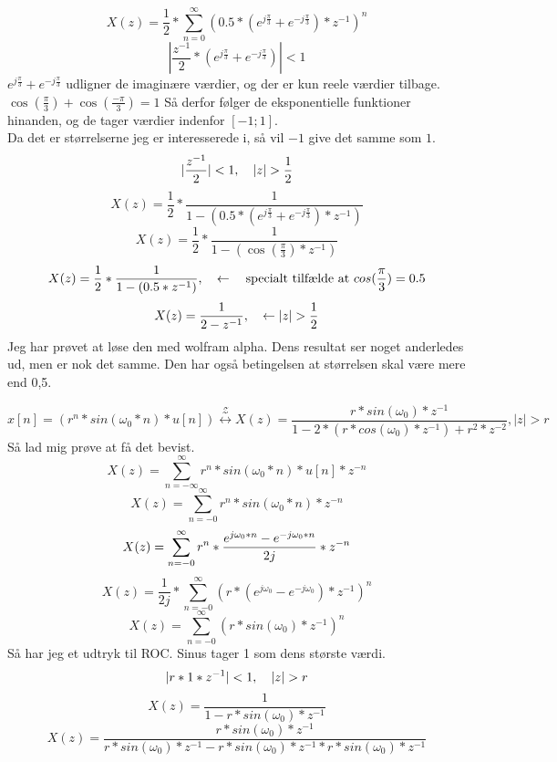 \begin{Opgaver}
\begin{kapitel}
\begin{Opgave}
\begin{UnderOpgave}[\text{$x[n] = (1/2)^n * cos(\pi * n/3)*u[n]$}, forkert]
                \[X(z) = \frac{1}{2} * \sum_{n=0}^{\infty}{(0.5 * (e^{j\frac{\pi}{3}} + e^{-j\frac{\pi}{3}}) * z^{-1})^n }\]
                \[|\frac{z^{-1}}{2} * (e^{j\frac{\pi}{3}} + e^{-j\frac{\pi}{3}})| < 1\]
                $e^{j\frac{\pi}{3}} + e^{-j\frac{\pi}{3}}$ udligner de imaginære værdier, og der er kun reele værdier tilbage. $\cos(\frac{\pi}{3}) + \cos(\frac{-\pi}{3}) = 1$
                Så derfor følger de eksponentielle funktioner hinanden, og de tager værdier indenfor $[-1; 1]$.\\
                Da det er størrelserne jeg er interesserede i, så vil $-1$ give det samme som $1$.\\
                \[|\frac{z^{-1}}{2}| < 1, \quad |z| > \frac{1}{2}\]
                \[X(z) = \frac{1}{2} * \frac{1}{1 - (0.5 * (e^{j\frac{\pi}{3}} + e^{-j\frac{\pi}{3}}) * z^{-1})}\]
                \[X(z) = \frac{1}{2} * \frac{1}{1 - (\cos(\frac{\pi}{3}) * z^{-1})}\]
                \[X(z) = \frac{1}{2} * \frac{1}{1 - (0.5 * z^{-1})}, \quad \leftarrow \quad \text{specialt tilfælde at } cos(\frac{\pi}{3}) = 0.5\]
                \[X(z) = \frac{1}{2 - z^{-1}},\quad \leftarrow |z| > \frac{1}{2}\]
                Jeg har prøvet at løse den med wolfram alpha. Dens resultat ser noget anderledes ud, men er nok det samme. Den har også betingelsen at størrelsen skal være mere end 0,5.
            \end{UnderOpgave}
        \end{Opgave}
        \begin{Opgave}
            \[x[n] = (r^n * sin(\omega_0 * n)*u[n]) \overset{\mathscr{Z}}{\leftrightarrow} X(z) = \frac{r*sin(\omega_0)*z^{-1}}{1 - 2*(r*cos(\omega_0) * z^{-1}) + r^2*z^{-2}}, |z| > r\]
            Så lad mig prøve at få det bevist.
            \[X(z) = \sum_{n=-\infty}^{\infty}{r^n * sin(\omega_0 * n) * u[n] * z^{-n}}\]
            \[X(z) = \sum_{n=-0}^{\infty}{r^n * sin(\omega_0 * n) * z^{-n}}\]
            \[X(z) = \sum_{n=-0}^{\infty}{r^n * \frac{e^{j\omega_0 * n} - e^{-j\omega_0 * n}}{2j} * z^{-n}}\]
            \[X(z) = \frac{1}{2j} * \sum_{n=-0}^{\infty}{(r * (e^{j\omega_0} - e^{-j\omega_0}) * z^{-1})^n}\]
            \[X(z) = \sum_{n=-0}^{\infty}{(r * sin(\omega_0) * z^{-1})^n}\]
            Så har jeg et udtryk til ROC. Sinus tager 1 som dens største værdi. 
            \[|r * 1 * z^{-1}| < 1, \quad |z| > r \]
            \[X(z) = {\frac{1}{1 - r * sin(\omega_0) * z^{-1}}}\]
            \[X(z) = {\frac{r * sin(\omega_0) * z^{-1}}{r * sin(\omega_0) * z^{-1} - r * sin(\omega_0) * z^{-1} * r * sin(\omega_0) * z^{-1}}}\]

\end{Opgave}
\end{kapitel}
\end{Opgaver}
